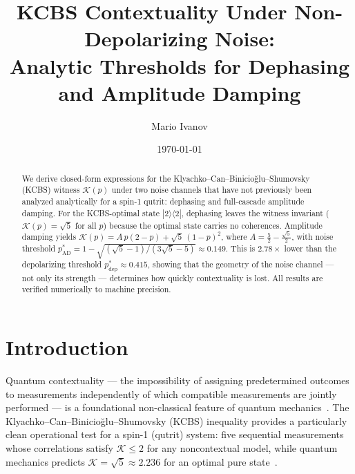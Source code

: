 \documentclass[twocolumn,showpacs,preprintnumbers,amsmath,amssymb,prl]{revtex4-2}
\newcommand{\ket}[1]{|#1\rangle}
\newcommand{\bra}[1]{\langle #1|}
\newcommand{\K}{\mathcal{K}}          %
\newcommand{\pstar}{p^{*}}            %
\begin{document}
\title{KCBS Contextuality Under Non-Depolarizing Noise:\\
       Analytic Thresholds for Dephasing and Amplitude Damping}

\author{Mario Ivanov}

\date{\today}

\begin{abstract}
We derive closed-form expressions for the Klyachko--Can--Binicio\u{g}lu--Shumovsky
(KCBS) witness $\K(p)$ under two noise channels that have not previously been
analyzed analytically for a spin-1 qutrit: dephasing and full-cascade amplitude
damping.
For the KCBS-optimal state $\ket{2}\bra{2}$, dephasing leaves the witness
invariant ($\K(p) = \sqrt{5}$ for all $p$) because the optimal state carries no
coherences.
Amplitude damping yields $\K(p) = A\,p(2-p) + \sqrt{5}\,(1-p)^2$, where
$A = \tfrac{5}{2} - \tfrac{\sqrt{5}}{2}$, with noise threshold
$\pstar_{\mathrm{AD}} = 1 - \sqrt{(\sqrt{5}-1)/(3\sqrt{5}-5)} \approx 0.149$.
This is $2.78\times$ lower than the depolarizing threshold
$\pstar_{\mathrm{dep}} \approx 0.415$, showing that the geometry of the noise
channel --- not only its strength --- determines how quickly contextuality is lost.
All results are verified numerically to machine precision.
\end{abstract}

\maketitle

\section{Introduction}
\label{sec:intro}

Quantum contextuality --- the impossibility of assigning predetermined outcomes
to measurements independently of which compatible measurements are jointly
performed --- is a foundational non-classical feature of quantum
mechanics~\cite{KochenSpecker1967,Budroni2022}.
The Klyachko--Can--Binicio\u{g}lu--Shumovsky (KCBS) inequality provides a
particularly clean operational test for a spin-1 (qutrit) system: five
sequential measurements whose correlations satisfy $\K \leq 2$ for any
noncontextual model, while quantum mechanics predicts $\K = \sqrt{5} \approx
2.236$ for an optimal pure state~\cite{Klyachko2008}.
\end{document}
